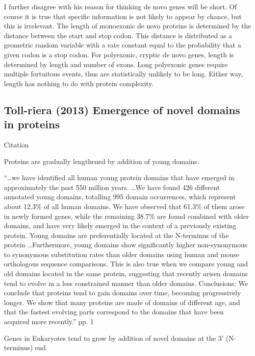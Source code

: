     I further disagree with his reason for thinking de novo genes will be
    short. Of course it is true that specific information is not likely to
    appear by chance, but this is irrelevant. The length of monoexonic de
    novo proteins is determined by the distance between the start and stop
    codon.  This distance is distributed as a geometric random variable
    with a rate constant equal to the probability that a given codon is a
    stop codon. For polyexonic, cryptic de novo genes, length is determined
    by length and number of exons. Long polyexonic genes require multiple
    fortuitous events, thus are statistically unlikely to be long. Either
    way, length has nothing to do with protein complexity.

\subsection{Toll-riera (2013) Emergence of novel domains in proteins}

    Citation \cite{toll-riera_emergence_2013}

    Proteins are gradually lengthened by addition of young domains.

    ``\ldots we have identified all human young protein domains that have
    emerged in approximately the past 550 million years. \ldots We have
    found 426 different annotated young domains, totalling 995 domain
    occurrences, which represent about 12.3\% of all human domains. We have
    observed that 61.3\% of them arose in newly formed genes, while the
    remaining 38.7\% are found combined with older domains, and have very
    likely emerged in the context of a previously existing protein. Young
    domains are preferentially located at the N-terminus of the protein
    \ldots Furthermore, young domains show significantly higher
    non-synonymous to synonymous substitution rates than older domains
    using human and mouse orthologous sequence comparisons. This is also
    true when we compare young and old domains located in the same protein,
    suggesting that recently arisen domains tend to evolve in a less
    constrained manner than older domains. Conclusions: We conclude that
    proteins tend to gain domains over time, becoming progressively longer.
    We show that many proteins are made of domains of different age, and
    that the fastest evolving parts correspond to the domains that have
    been acquired more recently.'' pp. 1

    Genes in Eukaryotes tend to grow by addition of novel domains at the 3'
    (N-terminus) end.

